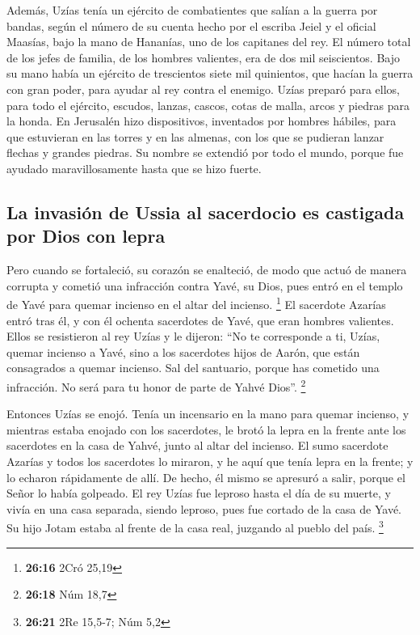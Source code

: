  Además, Uzías tenía un ejército de combatientes que
salían a la guerra por bandas, según el número de su cuenta hecho por el
escriba Jeiel y el oficial Maasías, bajo la mano de Hananías, uno de los
capitanes del rey.  El número total de los jefes de
familia, de los hombres valientes, era de dos mil seiscientos.
 Bajo su mano había un ejército de trescientos siete mil
quinientos, que hacían la guerra con gran poder, para ayudar al rey
contra el enemigo.  Uzías preparó para ellos, para todo
el ejército, escudos, lanzas, cascos, cotas de malla, arcos y piedras
para la honda.  En Jerusalén hizo dispositivos,
inventados por hombres hábiles, para que estuvieran en las torres y en
las almenas, con los que se pudieran lanzar flechas y grandes piedras.
Su nombre se extendió por todo el mundo, porque fue ayudado
maravillosamente hasta que se hizo fuerte.

\hypertarget{la-invasiuxf3n-de-ussia-al-sacerdocio-es-castigada-por-dios-con-lepra}{%
\subsection{La invasión de Ussia al sacerdocio es castigada por Dios con
lepra}\label{la-invasiuxf3n-de-ussia-al-sacerdocio-es-castigada-por-dios-con-lepra}}

 Pero cuando se fortaleció, su corazón se enalteció, de
modo que actuó de manera corrupta y cometió una infracción contra Yavé,
su Dios, pues entró en el templo de Yavé para quemar incienso en el
altar del incienso. \footnote{\textbf{26:16} 2Cró 25,19} 
El sacerdote Azarías entró tras él, y con él ochenta sacerdotes de Yavé,
que eran hombres valientes.  Ellos se resistieron al rey
Uzías y le dijeron: ``No te corresponde a ti, Uzías, quemar incienso a
Yavé, sino a los sacerdotes hijos de Aarón, que están consagrados a
quemar incienso. Sal del santuario, porque has cometido una infracción.
No será para tu honor de parte de Yahvé Dios''. \footnote{\textbf{26:18}
  Núm 18,7}

 Entonces Uzías se enojó. Tenía un incensario en la mano
para quemar incienso, y mientras estaba enojado con los sacerdotes, le
brotó la lepra en la frente ante los sacerdotes en la casa de Yahvé,
junto al altar del incienso.  El sumo sacerdote Azarías y
todos los sacerdotes lo miraron, y he aquí que tenía lepra en la frente;
y lo echaron rápidamente de allí. De hecho, él mismo se apresuró a
salir, porque el Señor lo había golpeado.  El rey Uzías
fue leproso hasta el día de su muerte, y vivía en una casa separada,
siendo leproso, pues fue cortado de la casa de Yavé. Su hijo Jotam
estaba al frente de la casa real, juzgando al pueblo del país.
\footnote{\textbf{26:21} 2Re 15,5-7; Núm 5,2}

